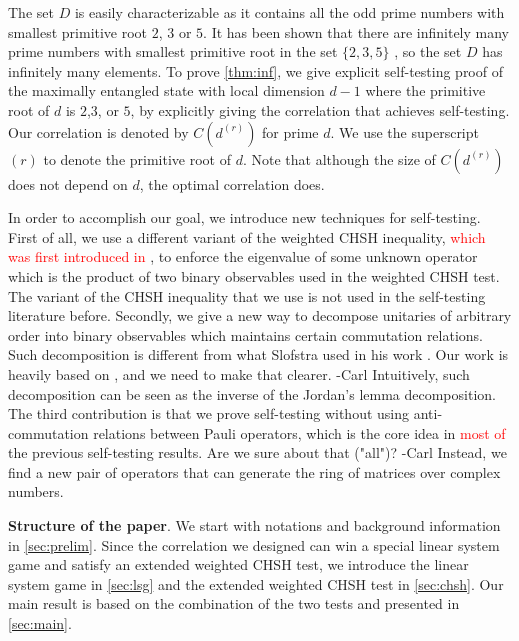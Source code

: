 \documentclass[11pt,letterpaper]{article}
\newcommand{\1}{\mathbb{1}}
\newcommand{\dr}[1]{d^{(#1)}}
\def\carl#1{{\color{blue} #1 -Carl}}
\newcommand{\hf}[1]{\textcolor{red}{#1}}
\newtheorem{theorem}{Theorem}
\theoremstyle{definition}
\begin{document}
The set $D$ is easily characterizable as it contains all the odd prime numbers with smallest
primitive root $2$, $3$ or $5$. It has been shown that there are infinitely many prime numbers
with smallest primitive root in the set $\{2,3,5\}$ \cite{murty1988}, so the set $D$ has infinitely many elements.
To prove \cref{thm:inf}, we give explicit self-testing proof of 
the maximally entangled state with local dimension $d-1$ where the primitive root of $d$ is $2$,$3$, or $5$, 
by explicitly giving the correlation that achieves self-testing. 
Our correlation is denoted by $C(\dr{r})$ for prime $d$.
We use the superscript $(r)$ to denote the primitive root of $d$.
Note that although the size of $C(\dr{r})$ does not depend on $d$, the optimal correlation does.


In order to accomplish our goal, we introduce new techniques for self-testing.
First of all, we use a different variant of the weighted CHSH inequality, \hf{which was first introduced in \cite{acin2012}}, to enforce the eigenvalue of
some unknown operator which is the product of two binary observables used in the weighted CHSH test.
The variant of the CHSH inequality that we use is not used in the self-testing literature before.
Secondly, we give a new way to decompose unitaries of arbitrary order into binary observables which maintains
certain commutation relations. Such decomposition is different from what Slofstra used in his work \cite{slofstra2017}.
\carl{Our work is heavily based on \cite{slofstra2017}, and we need to make that clearer.}
Intuitively, such decomposition can be seen as the inverse of the Jordan's lemma decomposition.
The third contribution is that we prove self-testing without using anti-commutation relations between Pauli operators, 
which is the core idea in \hf{most of} the previous self-testing results.
\carl{Are we sure about that ("all")?}
Instead, we find a new pair of operators that can generate the ring of matrices over complex numbers.


\textbf{Structure of the paper}.
We start with notations and background information in \cref{sec:prelim}.
Since the correlation we designed can win a special linear system game and satisfy
an extended weighted CHSH test, we introduce the linear system game
in \cref{sec:lsg} and the extended weighted CHSH test in \cref{sec:chsh}. 
Our main result is based on the combination of the two tests and presented in \cref{sec:main}. 
\end{document}
